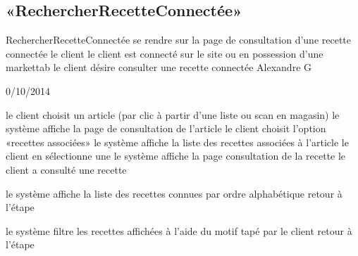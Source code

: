 \subsection{«RechercherRecetteConnectée»}

\startCU
\nom RechercherRecetteConnectée
\but se rendre sur la page de consultation d'une recette connectée
\acteur le client
\precondition le client est connecté sur le site ou en possession d'une markettab
\declenchement le client désire consulter une recette connectée
\auteur Alexandre G
\date 30/10/2014

\nominal %
\startnominal
{} le client choisit un article (par clic à partir d'une liste ou scan en magasin)
\etape le système affiche la page de consultation de l'article
\etape le client choisit l'option «recettes associées»
\etape le système affiche la liste des recettes associées à l'article 
 le client en sélectionne une
\etape le système affiche la page consultation de la recette
\stopnominal
\postcondition le client a consulté une recette

\alternatifs 
{} 
  \etape le système affiche la liste des recettes connues par ordre alphabétique
  \etape retour à l'étape 
\stopcondition
\stopalternatif

  \etape le système filtre les recettes affichées à l'aide du motif tapé par le client
  \etape retour à l'étape 
\stopcondition
\stopalternatif
\stopCU
